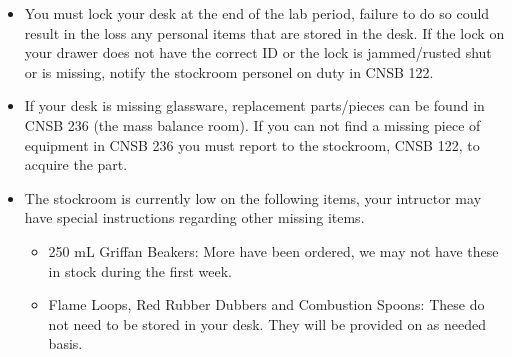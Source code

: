 \documentclass[11pt]{article}
\begin{document}
\begin{itemize}
\item You must lock your desk at the end of the lab period, failure to do so could result in the loss any personal items that are stored in the desk. If the lock on your drawer does not have the correct ID or the lock is jammed/rusted shut or is missing, notify the stockroom personel on duty in CNSB 122.
\item If your desk is missing glassware, replacement parts/pieces can be found in CNSB 236 (the mass balance room). If you can not find a missing piece of equipment in CNSB 236 you must report to the stockroom, CNSB 122, to acquire the part.
\item The stockroom is currently low on the following items, your intructor may have special instructions regarding other missing items.
\begin{itemize}
\item 250 mL Griffan Beakers: More have been ordered, we may not have these in stock during the first week.
\item Flame Loops, Red Rubber Dubbers and Combustion Spoons: These do not need to be stored in your desk. They will be provided on as needed basis.
\end{itemize}
\end{itemize}
\end{document}
